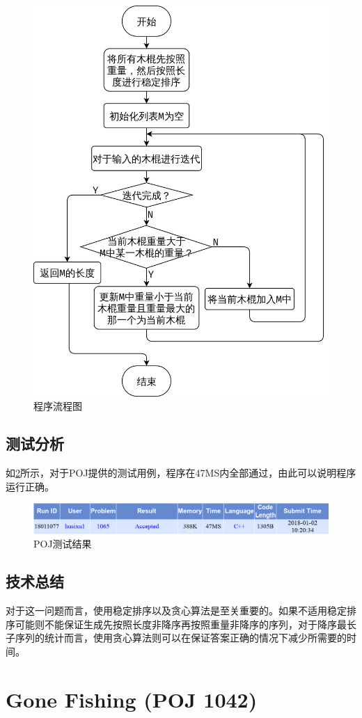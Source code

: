 \documentclass{report}
\begin{document}
\begin{figure}[ht]
    \centering
    \includegraphics[width=0.5\linewidth]{flowchart5.png}
    \caption{程序流程图}
    \label{fig:flowchart5}
\end{figure}

\section{测试分析}
\label{sec:ce_shi_fen_xi_5}
如\ref{fig:result5}所示，对于POJ提供的测试用例，程序在47MS内全部通过，由此可以说明程序运行正确。

\begin{figure}[ht]
    \centering
    \includegraphics[width=0.9\linewidth]{result5.png}
    \caption{POJ测试结果}
    \label{fig:result5}
\end{figure}

\section{技术总结}
\label{sec:ji_zhu_zong_jie_5}
对于这一问题而言，使用稳定排序以及贪心算法是至关重要的。如果不适用稳定排序可能则不能保证生成先按照长度非降序再按照重量非降序的序列，对于降序最长子序列的统计而言，使用贪心算法则可以在保证答案正确的情况下减少所需要的时间。

\chapter{Gone Fishing (POJ 1042)}
\label{cha:gone_fishing_poj_1042_}
\end{document}
